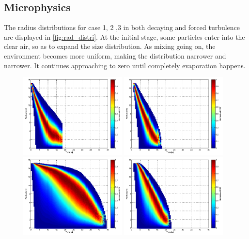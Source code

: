 \documentclass[12pt]{article}
\begin{document}
\subsection{Microphysics}
The radius distributions for case 1, 2 ,3 in both decaying and forced turbulence are displayed in \ref{fig:rad_distri}. At the initial stage, some particles enter into the clear air, so as to expand the size distribution. As mixing going on, the environment becomes more uniform, making the distribution narrower and narrower. It continues approaching to zero until completely evaporation happens.
\begin{figure}[H]
\includegraphics[width=0.48\textwidth]{Figures/pdf_radius_d1}
\includegraphics[width=0.48\textwidth]{Figures/pdf_radius_f1}\\
\includegraphics[width=0.48\textwidth]{Figures/pdf_radius_d2}
\includegraphics[width=0.48\textwidth]{Figures/pdf_radius_f2}\\

\end{figure}
\end{document}
